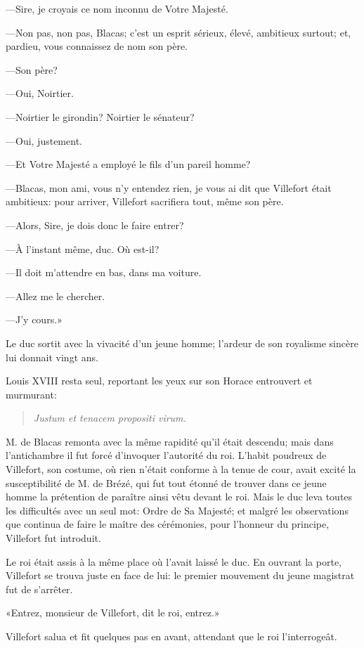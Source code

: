 —Sire, je croyais ce nom inconnu de Votre Majesté.

—Non pas, non pas, Blacas; c'est un esprit sérieux, élevé, ambitieux surtout; et, pardieu, vous connaissez de nom son père.

—Son père?

—Oui, Noirtier.

—Noirtier le girondin? Noirtier le sénateur?

—Oui, justement.

—Et Votre Majesté a employé le fils d'un pareil homme?

—Blacas, mon ami, vous n'y entendez rien, je vous ai dit que Villefort était ambitieux: pour arriver, Villefort sacrifiera tout, même son père.

—Alors, Sire, je dois donc le faire entrer?

—À l'instant même, duc. Où est-il?

—Il doit m'attendre en bas, dans ma voiture.

—Allez me le chercher.

—J'y cours.»

Le duc sortit avec la vivacité d'un jeune homme; l'ardeur de son royalisme sincère lui donnait vingt ans.

Louis XVIII resta seul, reportant les yeux sur son Horace entrouvert et murmurant:

\begin{quote}\textit{Justum et tenacem propositi virum.}\end{quote}

M. de Blacas remonta avec la même rapidité qu'il était descendu; mais dans l'antichambre il fut forcé d'invoquer l'autorité du roi. L'habit poudreux de Villefort, son costume, où rien n'était conforme à la tenue de cour, avait excité la susceptibilité de M. de Brézé, qui fut tout étonné de trouver dans ce jeune homme la prétention de paraître ainsi vêtu devant le roi. Mais le duc leva toutes les difficultés avec un seul mot: Ordre de Sa Majesté; et malgré les observations que continua de faire le maître des cérémonies, pour l'honneur du principe, Villefort fut introduit.

Le roi était assis à la même place où l'avait laissé le duc. En ouvrant la porte, Villefort se trouva juste en face de lui: le premier mouvement du jeune magistrat fut de s'arrêter.

«Entrez, monsieur de Villefort, dit le roi, entrez.»

Villefort salua et fit quelques pas en avant, attendant que le roi l'interrogeât.

